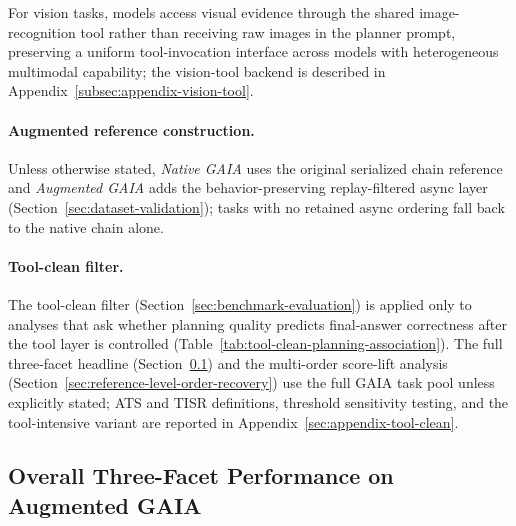 \documentclass{article}
\begin{document}
For vision tasks, models access visual evidence through the shared image-recognition tool rather than receiving raw images in the planner prompt, preserving a uniform tool-invocation interface across models with heterogeneous multimodal capability; the vision-tool backend is described in Appendix~\ref{subsec:appendix-vision-tool}.

\paragraph{Augmented reference construction.}
Unless otherwise stated, \emph{Native GAIA} uses the original serialized chain reference and \emph{Augmented GAIA} adds the behavior-preserving replay-filtered async layer (Section~\ref{sec:dataset-validation}); tasks with no retained async ordering fall back to the native chain alone.

\paragraph{Tool-clean filter.}
The tool-clean filter (Section~\ref{sec:benchmark-evaluation}) is applied only to analyses that ask whether planning quality predicts final-answer correctness after the tool layer is controlled (Table~\ref{tab:tool-clean-planning-association}). The full three-facet headline (Section~\ref{sec:overall-three-facet}) and the multi-order score-lift analysis (Section~\ref{sec:reference-level-order-recovery}) use the full GAIA task pool unless explicitly stated; ATS and TISR definitions, threshold sensitivity testing, and the tool-intensive variant are reported in Appendix~\ref{sec:appendix-tool-clean}.

\subsection{Overall Three-Facet Performance on Augmented GAIA}
\label{sec:overall-three-facet}
\end{document}
